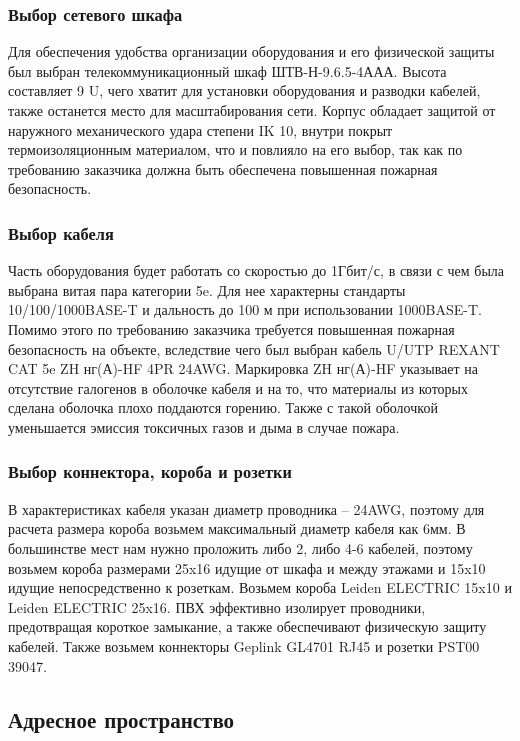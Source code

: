     \subsubsection{Выбор сетевого шкафа}
    Для обеспечения удобства организации оборудования и его физической защиты был выбран телекоммуникационный шкаф ШТВ-Н-9.6.5-4ААА.
    Высота составляет 9 U, чего хватит для установки оборудования и разводки кабелей, также останется место для масштабирования сети.
    Корпус обладает защитой от наружного механического удара степени IK 10, внутри покрыт термоизоляционным материалом,
    что и повлияло на его выбор, так как по требованию заказчика должна быть обеспечена повышенная пожарная безопасность.

    \subsubsection{Выбор кабеля}\label{subsubsec:func:WireChoice}

    Часть оборудования будет работать со скоростью до 1Гбит/с, в связи с чем была выбрана витая пара категории 5e.
    Для нее характерны стандарты 10/100/1000BASE-T и дальность до 100 м при использовании 1000BASE-T.
    Помимо этого по требованию заказчика требуется повышенная пожарная безопасность на объекте,
    вследствие чего был выбран кабель U/UTP REXANT CAT 5e ZH нг(А)-HF 4PR 24AWG.
    Маркировка ZH нг(А)-HF указывает на отсутствие галогенов в оболочке кабеля и на то,
    что материалы из которых сделана оболочка плохо поддаются горению.
    Также с такой оболочкой уменьшается эмиссия токсичных газов и дыма в случае пожара.

    \subsubsection{Выбор коннектора, короба и розетки}\label{subsubsec:func:OtherPassiveChoice}
В характеристиках кабеля указан диаметр проводника – 24AWG,
поэтому для расчета размера короба возьмем максимальный диаметр кабеля как 6мм.
В большинстве мест нам нужно проложить либо 2, либо 4-6 кабелей, поэтому возьмем короба размерами 25x16 идущие от шкафа и между этажами и 15x10 идущие непосредственно к розеткам.
Возьмем короба Leiden ELECTRIC 15x10 и Leiden ELECTRIC 25x16.
ПВХ эффективно изолирует проводники, предотвращая короткое замыкание,
а также обеспечивают физическую защиту кабелей.
Также возьмем коннекторы Geplink GL4701 RJ45 и розетки PST00 39047.

\subsection{Адресное пространство}\label{subsec:func:addresses}

